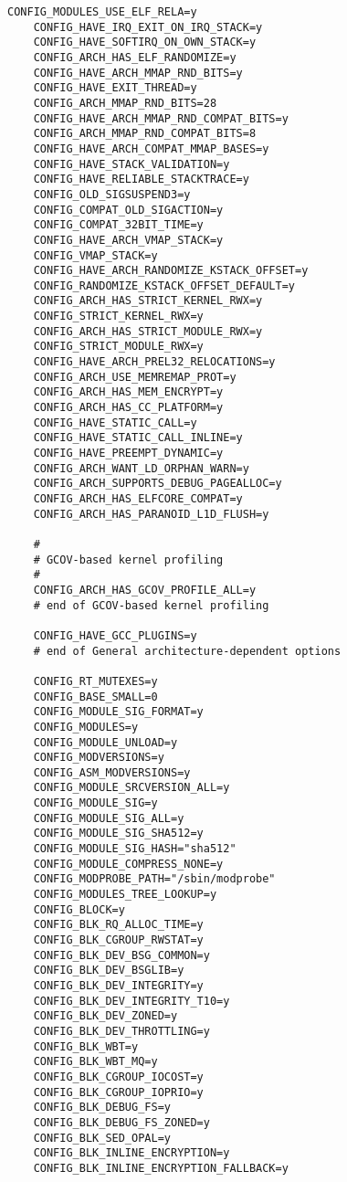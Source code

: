 \begin{multicols}{2}
\begin{lstlisting}[caption=kernel config,label=kconfig,]
    CONFIG_MODULES_USE_ELF_RELA=y
    CONFIG_HAVE_IRQ_EXIT_ON_IRQ_STACK=y
    CONFIG_HAVE_SOFTIRQ_ON_OWN_STACK=y
    CONFIG_ARCH_HAS_ELF_RANDOMIZE=y
    CONFIG_HAVE_ARCH_MMAP_RND_BITS=y
    CONFIG_HAVE_EXIT_THREAD=y
    CONFIG_ARCH_MMAP_RND_BITS=28
    CONFIG_HAVE_ARCH_MMAP_RND_COMPAT_BITS=y
    CONFIG_ARCH_MMAP_RND_COMPAT_BITS=8
    CONFIG_HAVE_ARCH_COMPAT_MMAP_BASES=y
    CONFIG_HAVE_STACK_VALIDATION=y
    CONFIG_HAVE_RELIABLE_STACKTRACE=y
    CONFIG_OLD_SIGSUSPEND3=y
    CONFIG_COMPAT_OLD_SIGACTION=y
    CONFIG_COMPAT_32BIT_TIME=y
    CONFIG_HAVE_ARCH_VMAP_STACK=y
    CONFIG_VMAP_STACK=y
    CONFIG_HAVE_ARCH_RANDOMIZE_KSTACK_OFFSET=y
    CONFIG_RANDOMIZE_KSTACK_OFFSET_DEFAULT=y
    CONFIG_ARCH_HAS_STRICT_KERNEL_RWX=y
    CONFIG_STRICT_KERNEL_RWX=y
    CONFIG_ARCH_HAS_STRICT_MODULE_RWX=y
    CONFIG_STRICT_MODULE_RWX=y
    CONFIG_HAVE_ARCH_PREL32_RELOCATIONS=y
    CONFIG_ARCH_USE_MEMREMAP_PROT=y
    CONFIG_ARCH_HAS_MEM_ENCRYPT=y
    CONFIG_ARCH_HAS_CC_PLATFORM=y
    CONFIG_HAVE_STATIC_CALL=y
    CONFIG_HAVE_STATIC_CALL_INLINE=y
    CONFIG_HAVE_PREEMPT_DYNAMIC=y
    CONFIG_ARCH_WANT_LD_ORPHAN_WARN=y
    CONFIG_ARCH_SUPPORTS_DEBUG_PAGEALLOC=y
    CONFIG_ARCH_HAS_ELFCORE_COMPAT=y
    CONFIG_ARCH_HAS_PARANOID_L1D_FLUSH=y
    
    #
    # GCOV-based kernel profiling
    #
    CONFIG_ARCH_HAS_GCOV_PROFILE_ALL=y
    # end of GCOV-based kernel profiling
    
    CONFIG_HAVE_GCC_PLUGINS=y
    # end of General architecture-dependent options
    
    CONFIG_RT_MUTEXES=y
    CONFIG_BASE_SMALL=0
    CONFIG_MODULE_SIG_FORMAT=y
    CONFIG_MODULES=y
    CONFIG_MODULE_UNLOAD=y
    CONFIG_MODVERSIONS=y
    CONFIG_ASM_MODVERSIONS=y
    CONFIG_MODULE_SRCVERSION_ALL=y
    CONFIG_MODULE_SIG=y
    CONFIG_MODULE_SIG_ALL=y
    CONFIG_MODULE_SIG_SHA512=y
    CONFIG_MODULE_SIG_HASH="sha512"
    CONFIG_MODULE_COMPRESS_NONE=y
    CONFIG_MODPROBE_PATH="/sbin/modprobe"
    CONFIG_MODULES_TREE_LOOKUP=y
    CONFIG_BLOCK=y
    CONFIG_BLK_RQ_ALLOC_TIME=y
    CONFIG_BLK_CGROUP_RWSTAT=y
    CONFIG_BLK_DEV_BSG_COMMON=y
    CONFIG_BLK_DEV_BSGLIB=y
    CONFIG_BLK_DEV_INTEGRITY=y
    CONFIG_BLK_DEV_INTEGRITY_T10=y
    CONFIG_BLK_DEV_ZONED=y
    CONFIG_BLK_DEV_THROTTLING=y
    CONFIG_BLK_WBT=y
    CONFIG_BLK_WBT_MQ=y
    CONFIG_BLK_CGROUP_IOCOST=y
    CONFIG_BLK_CGROUP_IOPRIO=y
    CONFIG_BLK_DEBUG_FS=y
    CONFIG_BLK_DEBUG_FS_ZONED=y
    CONFIG_BLK_SED_OPAL=y
    CONFIG_BLK_INLINE_ENCRYPTION=y
    CONFIG_BLK_INLINE_ENCRYPTION_FALLBACK=y
    

\end{lstlisting}
\end{multicols}
